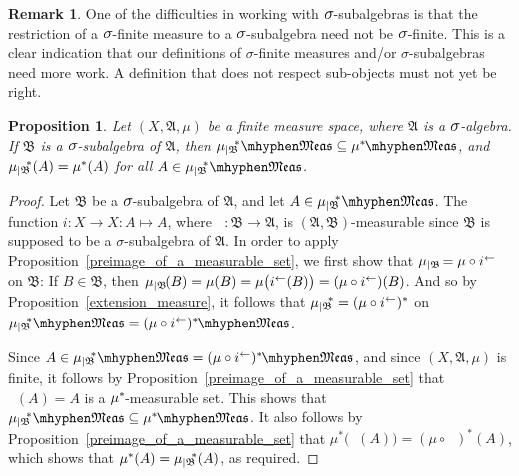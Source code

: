 \documentclass[
twoside=true,
paper=letter,
fontsize=9pt,
pagesize=auto,
leqno,
openany,
headsepline,
overfullrule,
]{scrbook}
\theoremstyle{plain}
\theoremstyle{plain}
\newtheorem{prop}[thm]{Proposition}
\theoremstyle{definition}
\newtheorem{rmk}[thm]{Remark}
\theoremstyle{bfnoteitalic}
\theoremstyle{bfnoteroman}
\newcommand{\sigalg}[1]{\mathfrak{#1}}
\newcommand{\textsigma}{\hbox{\large{$\sigma$}}\kern-1pt}
\newcommand{\restrictedto}[1]{_{\lvert#1}\kern-1.5pt}
\newcommand{\preimage}[1]{\mathop{#1^{\leftarrow}}}
\newcommand{\sigmaalgebra}{\sigalg{A}}
\newcommand{\sigmaalgebraii}{\sigalg{B}}
\newcommand{\measurable}[1]{{#1}\mhyphen\mathfrak{Meas}}
\newcommand{\kernast}{\ast\kern-1pt}
\newcommand{\measuresubstar}[1]{\measure\restrictedto{#1}\kern-2pt^*}
\newcommand{\measurespace}{X}
\newcommand{\measure}{\mu}
\begin{document}
\begin{rmk}
One of the difficulties in working with $\textsigma$\hyp{}subalgebras is that
the restriction of a $\textsigma$\hyp{}finite measure to a $\textsigma$\hyp{}subalgebra need not be 
$\textsigma$\hyp{}finite.  This is a clear indication that our definitions of \textsigma\hyp{}finite measures and/or \textsigma\hyp{}subalgebras need more work. A definition that does not respect sub\hyp{}objects must not yet be right.
\end{rmk}





\begin{prop}\label{measurable_inclusion}
Let $(\measurespace, \sigmaalgebra, \measure)$ be a finite measure space, where $\sigmaalgebra$ is a $\textsigma$-algebra.  If $\sigmaalgebraii$ is a $\textsigma$-subalgebra of $\sigmaalgebra$, then 
$\measurable{\measuresubstar{\sigmaalgebraii}} \subseteq \measurable{\measure^\kernast}$, and
$\measuresubstar{\sigmaalgebraii}(A) = \measure^*(A)$ for all 
$A \in \measurable{\measuresubstar{\sigmaalgebraii}}$.
\end{prop}



\begin{proof}
Let $\sigmaalgebraii$ be a $\textsigma$-subalgebra of $\sigmaalgebra$, and let 
$A\in \measurable{\measuresubstar{\sigmaalgebraii}}$.
The function $i:\measurespace\to\measurespace : A \mapsto A$, where $\preimage{i}:\sigmaalgebraii\to\sigmaalgebra$, is $(\sigmaalgebra, \sigmaalgebraii)$\hyp{}measurable since $\sigmaalgebraii$ is supposed to be a \textsigma-subalgebra of $\sigmaalgebra$.
In order to apply Proposition~\ref{preimage_of_a_measurable_set}, we first show that $\measure\restrictedto{\sigmaalgebraii} = \measure\circ\preimage{i}$ on $\sigmaalgebraii$: If $B\in\sigmaalgebraii$, then 
$\measure\restrictedto{\sigmaalgebraii}(B) 
= \measure(B) 
= \measure\bigl(\preimage{i}(B)\bigr)
= (\measure\circ\preimage{i})(B)$.
And so by Proposition~\ref{extension_measure}, it follows that $\measuresubstar{\sigmaalgebraii}=(\measure\circ\preimage{i})^*$ on 
$\measurable{\measuresubstar{\sigmaalgebraii}} 
= 
\measurable{(\measure\circ\preimage{i})^\kernast}$.


Since $A\in \measurable{\measuresubstar{\sigmaalgebraii}} =\measurable{(\measure\circ\preimage{i})^\kernast}$,
and since $(\measurespace, \sigmaalgebra, \measure)$ is finite,
it follows by Proposition~\ref{preimage_of_a_measurable_set} that 
$\preimage{i}(A) = A$ is a $\measure^\kernast$-measurable set.  This shows that 
$\measurable{\measuresubstar{\sigmaalgebraii}} \subseteq \measurable{\measure^\kernast}$. 
It also follows by Proposition~\ref{preimage_of_a_measurable_set} that 
$\measure^*\bigl(\preimage{i}(A)\bigr) = (\measure\circ\preimage{i})^*(A)$, which shows that $\measure^*(A) = \measuresubstar{\sigmaalgebraii}(A)$, as required.
\end{proof}
\end{document}
